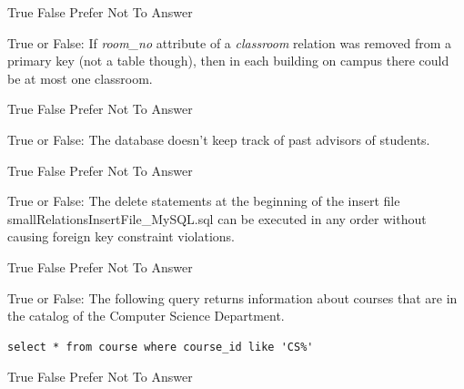 \documentclass[12pt, addpoints, answers]{exam}
\begin{document}
\begin{questions}
\begin{minipage}{\linewidth}
\vspace{0.5em}
\begin{checkboxes}
    \choice True
    \CorrectChoice False
    \CorrectChoice Prefer Not To Answer
\end{checkboxes}
\end{minipage}\vspace{1em}

\begin{minipage}{\linewidth}
\question[3]
True or False: If \textit{room\_no} attribute of a \textit{classroom} relation was removed from a primary key (not a table though), 
then in each building on campus there could be at most one classroom.\par\vspace{0.5em}
\begin{checkboxes}
    \CorrectChoice True
    \choice False
    \CorrectChoice Prefer Not To Answer
\end{checkboxes}
\end{minipage}\vspace{1em}

\begin{minipage}{\linewidth}
\question[3]
True or False: The database doesn’t keep track of past advisors of students.\par\vspace{0.5em}
\begin{checkboxes}
    \CorrectChoice True
    \choice False
    \CorrectChoice Prefer Not To Answer
\end{checkboxes}
\end{minipage}\vspace{1em}

\begin{minipage}{\linewidth}
\question[3]
True or False: The delete statements at the beginning of the insert file smallRelationsInsertFile\_MySQL.sql 
can be executed in any order without causing foreign key constraint violations.\par\vspace{0.5em}
\begin{checkboxes}
    \choice True
    \CorrectChoice False
    \CorrectChoice Prefer Not To Answer
\end{checkboxes}
\end{minipage}\vspace{1em}

\begin{minipage}{\linewidth}
\question[3]
True or False: The following query returns information about courses that are in the catalog of the Computer Science Department.\par\vspace{0.5em}
\begin{verbatim}
select * from course where course_id like 'CS%'
\end{verbatim}
\begin{checkboxes}
    \choice True
    \CorrectChoice False
    \CorrectChoice Prefer Not To Answer
\end{checkboxes}
\end{minipage}\vspace{1em}


\end{questions}
\end{document}
